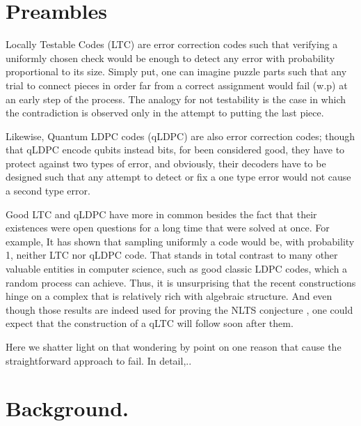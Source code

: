 \documentclass[manuscript,screen,review]{acmart}
\begin{document}
\section{Preambles}

Locally Testable Codes (LTC) are error correction codes such that verifying a uniformly chosen check would be enough to detect any error with probability proportional to its size. Simply put, one can imagine puzzle parts such that any trial to connect pieces in order far from a correct assignment would fail (w.p) at an early step of the process. The analogy for not testability is the case in which the contradiction is observed only in the attempt to putting the last piece.
 
 Likewise, Quantum LDPC codes (qLDPC) are also error correction codes; though that qLDPC encode qubits instead bits, for been considered good, they have to protect against two types of error, and obviously, their decoders have to be designed such that any attempt to detect or fix a one type error would not cause a second type error.
 
 Good LTC and qLDPC have more in common besides the fact that their existences were open questions for a long time that were solved at once. For example, It has shown that sampling uniformly a code would be, with probability 1, neither LTC \cite{Sasson} nor qLDPC code. That stands in total contrast to many other valuable entities in computer science,  such as good classic LDPC codes, which a random process can achieve. Thus, it is unsurprising that the recent constructions hinge on a complex that is relatively rich with algebraic structure. And even though those results are indeed used for proving the NLTS conjecture \cite{anshu2022nlts}, one could expect that the construction of a qLTC will follow soon after them. 

 Here we shatter light on that wondering by point on one reason that cause the straightforward approach to fail. In detail,..    



\section{Background.}
\end{document}

